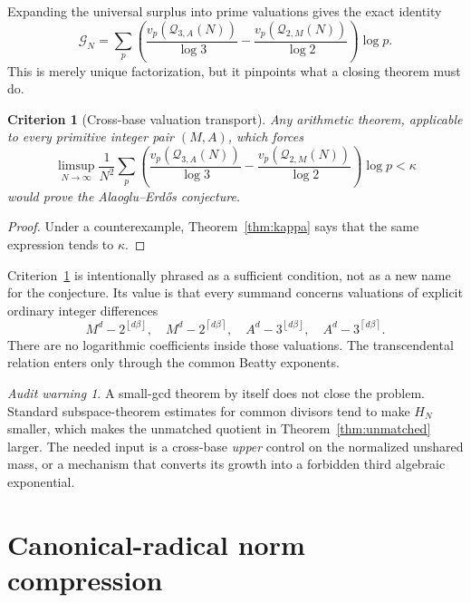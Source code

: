 \documentclass[11pt,oneside]{article}
\newtheorem{criterion}[theorem]{Criterion}
\theoremstyle{definition}
\theoremstyle{remark}
\newtheorem{warning}[theorem]{Audit warning}
\newcommand{\floor}[1]{\left\lfloor #1\right\rfloor}
\newcommand{\ceil}[1]{\left\lceil #1\right\rceil}
\newcommand{\vpp}[2]{v_{#1}\!\left(#2\right)}
\begin{document}
Expanding the universal surplus into prime valuations gives the exact identity
\begin{equation}
 \mathcal G_N=
 \sum_p\left(
 \frac{\vpp{p}{\mathcal Q_{3,A}(N)}}{\log3}
 -\frac{\vpp{p}{\mathcal Q_{2,M}(N)}}{\log2}
 \right)\log p.
 \label{eq:valuation-identity}
\end{equation}
This is merely unique factorization, but it pinpoints what a closing theorem must do.

\begin{criterion}[Cross-base valuation transport]
\label{crit:transport}
Any arithmetic theorem, applicable to every primitive integer pair $(M,A)$, which forces
\begin{equation}
 \limsup_{N\to\infty}\frac1{N^2}
 \sum_p\left(
 \frac{\vpp{p}{\mathcal Q_{3,A}(N)}}{\log3}
 -\frac{\vpp{p}{\mathcal Q_{2,M}(N)}}{\log2}
 \right)\log p<\kappa
 \label{eq:transport-target}
\end{equation}
would prove the Alaoglu--Erd\H{o}s conjecture.
\end{criterion}

\begin{proof}
Under a counterexample, Theorem~\ref{thm:kappa} says that the same expression tends to
$\kappa$.
\end{proof}

Criterion~\ref{crit:transport} is intentionally phrased as a sufficient condition, not as a
new name for the conjecture.  Its value is that every summand concerns valuations of explicit
ordinary integer differences
\[
 M^d-2^{\floor{d\beta}},\quad M^d-2^{\ceil{d\beta}},\quad
 A^d-3^{\floor{d\beta}},\quad A^d-3^{\ceil{d\beta}}.
\]
There are no logarithmic coefficients inside those valuations.  The transcendental relation
enters only through the common Beatty exponents.

\begin{warning}
A small-gcd theorem by itself does not close the problem.  Standard subspace-theorem estimates
for common divisors tend to make $H_N$ smaller, which makes the unmatched quotient in
Theorem~\ref{thm:unmatched} larger.  The needed input is a cross-base \emph{upper} control on
the normalized unshared mass, or a mechanism that converts its growth into a forbidden third
algebraic exponential.
\end{warning}

\section{Canonical-radical norm compression}
\label{sec:radical}
\end{document}
